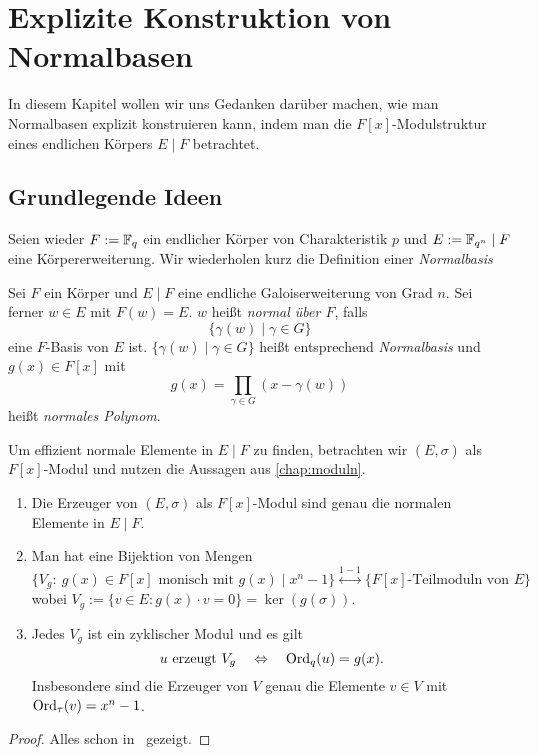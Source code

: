 \chapter{Explizite Konstruktion von Normalbasen}
In diesem Kapitel wollen wir uns Gedanken darüber machen, wie man Normalbasen
explizit konstruieren kann, indem man die $F[x]$-Modulstruktur eines endlichen
Körpers $E \mid F$ betrachtet.

\section{Grundlegende Ideen}

Seien wieder $F := \mathbb{F}_q$ ein endlicher Körper von Charakteristik $p$ und 
$E := \mathbb{F}_{q^n} \mid F$ eine Körpererweiterung.
Wir wiederholen kurz die Definition einer \emph{Normalbasis}

\begin{definition}
  Sei $F$ ein Körper und $E \mid F$ eine endliche Galoiserweiterung von Grad
  $n$. Sei ferner $w\in E$ mit $F(w) = E$. $w$ heißt \emph{normal über $F$},
  falls
  \[ \{ \gamma(w) \mid \gamma \in G\}\]
  eine $F$-Basis von $E$ ist. 
  $\{ \gamma(w) \mid \gamma \in G\}$ heißt entsprechend \emph{Normalbasis} und
  $g(x) \in F[x]$ mit 
  \[ g(x) = \prod_{\gamma \in G}(x - \gamma(w))\]
  heißt \emph{normales Polynom}.
\end{definition}

Um effizient normale Elemente in $E\mid F$ zu finden, betrachten wir 
$(E,\sigma)$ als $F[x]$-Modul und nutzen die Aussagen aus
\autoref{chap:moduln}.

\begin{satz}
  \begin{enumerate}
    \item Die Erzeuger von $(E,\sigma)$ als $F[x]$-Modul sind genau die 
      normalen Elemente in $E\mid F$.
    \item Man hat eine Bijektion von Mengen
      \[ \{V_g :\ g(x) \in F[x] \text{ monisch mit } g(x) \mid x^n-1\}
        \overset{1-1}{\longleftrightarrow}
        \{F[x] \text{-Teilmoduln von }E\}\]
        wobei $V_g := \{v \in E : g(x)\cdot v = 0\} = \ker(g(\sigma))$.
    \item Jedes $V_g$ ist ein zyklischer Modul und es gilt
      \[u \text{ erzeugt } V_g \quad\Leftrightarrow \quad
        \operatorname{Ord}_q(u) = g(x).\]
        Insbesondere sind die Erzeuger von $V$ genau die Elemente $v \in V$ mit 
        $\operatorname{Ord}_\tau(v) = x^n-1$.
  \end{enumerate}
\end{satz}
\begin{proof}
  Alles schon in \TODO~gezeigt.
\end{proof}

